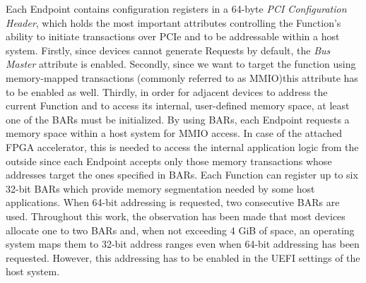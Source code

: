 Each Endpoint contains configuration registers in a 64-byte \emph{PCI Configuration Header}, which
holds the most important attributes controlling the Function's ability to initiate transactions over
PCIe and to be addressable within a host system. Firstly, since devices cannot generate Requests by
default, the \emph{Bus Master} attribute is enabled. Secondly, since we want to target the function
using memory-mapped transactions (commonly referred to as \ac{MMIO})\footnotemark this attribute has to be
enabled as well. Thirdly, in order for adjacent devices to address the current Function and to access
its internal, user-defined memory space, at least one of the \acp{BAR} must be initialized.  By
using BARs, each Endpoint requests a memory space within a host system for \ac{MMIO} access. In case
of the attached FPGA accelerator, this is needed to access the internal application logic from the
outside since each Endpoint accepts only those memory transactions whose addresses target the ones
specified in BARs. Each Function can register up to six 32-bit BARs which provide memory segmentation
needed by some host applications. When 64-bit addressing is requested, two consecutive BARs are
used\cite{pcie_book}. Throughout this work, the observation has been made that most devices allocate
one to two BARs and, when not exceeding 4 GiB of space, an operating system maps them to 32-bit
address ranges even when 64-bit addressing has been requested. However, this addressing has to
be enabled in the UEFI settings of the host system.


